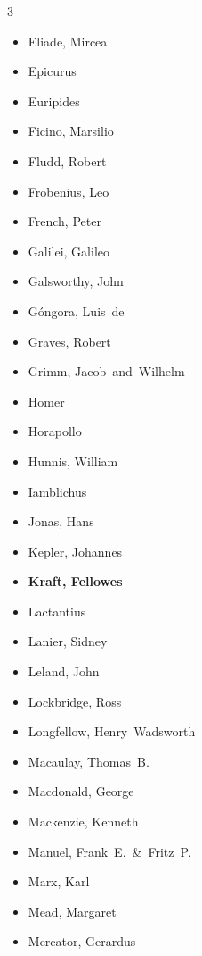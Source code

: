 \documentclass[10pt,makeidx]{extreport}
\begin{document}
\begin{multicols}{3}
\begin{itemize}
  \item Eliade, Mircea
  \item Epicurus
  \item Euripides
  \item Ficino, Marsilio
  \item Fludd, Robert
  \item Frobenius, Leo
  \item French, Peter
  \item Galilei, Galileo
  \item Galsworthy, John
  \item Góngora, Luis~de
  \item Graves, Robert
  \item Grimm, Jacob~and~Wilhelm
  \item Homer
  \item Horapollo
  \item Hunnis, William
  \item Iamblichus
  \item Jonas, Hans
  \item Kepler, Johannes
  \item \textbf{Kraft, Fellowes}
  \item Lactantius
  \item Lanier, Sidney
  \item Leland, John
  \item Lockbridge, Ross
  \item Longfellow, Henry~Wadsworth
  \item Macaulay, Thomas~B.
  \item Macdonald, George
  \item Mackenzie, Kenneth
  \item Manuel, Frank~E.~\&~Fritz~P.
  \item Marx, Karl
  \item Mead, Margaret
  \item Mercator, Gerardus

\end{itemize}
\end{multicols}
\end{document}
